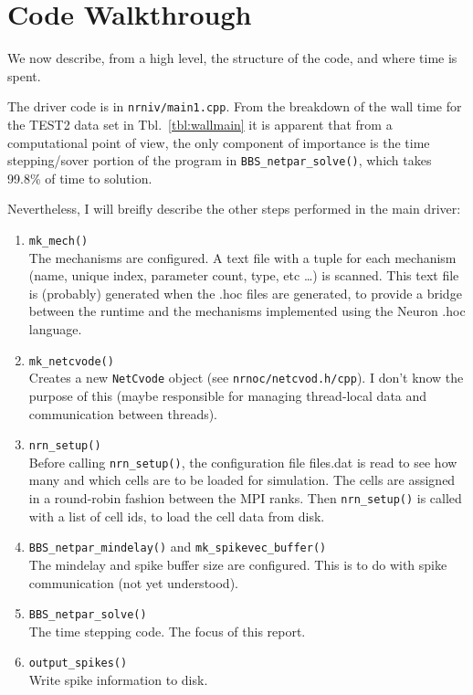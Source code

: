 \documentclass[11pt,a4paper]{article}
\newcommand{\lst}[1]{\lstinline!#1!}
\newcommand{\tbl}[1]{Tbl.~\ref{#1}}
\newcommand{\file}[1]{\lstinline[basicstyle=\normalsize,]!#1!}
\begin{document}
\section{Code Walkthrough}
We now describe, from a high level, the structure of the code, and where time is spent.

The driver code is in \file{nrniv/main1.cpp}. From the breakdown of the wall time for the TEST2 data set in \tbl{tbl:wallmain} it is apparent that from a computational point of view, the only component of importance is the time stepping/sover portion of the program in \lst{BBS_netpar_solve()}, which takes 99.8\% of time to solution.

Nevertheless, I will breifly describe the other steps performed in the main driver:
\begin{enumerate}
\item \lst{mk_mech()}\\
   The mechanisms are configured. A text file with a tuple for each mechanism (name, unique index, parameter count, type,  etc \dots) is scanned. This text file is (probably) generated when the .hoc files are generated, to provide a bridge between the runtime and the mechanisms implemented using the Neuron .hoc language.
\item \lst{mk_netcvode()}\\
    Creates a new \lst{NetCvode} object (see \file{nrnoc/netcvod.h/cpp}). I don't know the purpose of this (maybe responsible for managing thread-local data and communication between threads).
\item \lst{nrn_setup()}\\
    Before calling \lst{nrn_setup()}, the configuration file files.dat is read to see how many and which cells are to be loaded for simulation. The cells are assigned in a round-robin fashion between the MPI ranks. Then \lst{nrn_setup()} is called with a list of cell ids, to load the cell data from disk.
\item \lst{BBS_netpar_mindelay()} and \lst{mk_spikevec_buffer()}\\
    The mindelay and spike buffer size are configured. This is to do with spike communication (not yet understood).
\item \lst{BBS_netpar_solve()} \\
    The time stepping code. The focus of this report.
\item \lst{output_spikes()} \\
    Write spike information to disk.
\end{enumerate}
\end{document}
